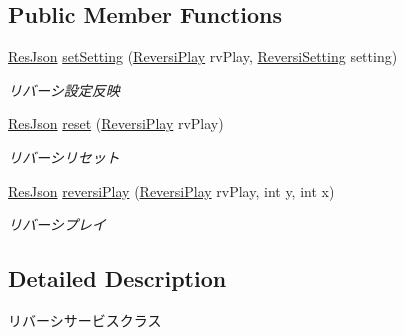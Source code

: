 \subsection*{Public Member Functions}
\begin{DoxyCompactItemize}
\item 
\hyperlink{classjp_1_1gr_1_1java__conf_1_1yuta__yoshinaga_1_1reversi_1_1model_1_1_res_json}{Res\+Json} \hyperlink{classjp_1_1gr_1_1java__conf_1_1yuta__yoshinaga_1_1reversi_1_1service_1_1_reversi_service_a58b49b782275a456cd4ae6ed332446e3}{set\+Setting} (\hyperlink{classjp_1_1gr_1_1java__conf_1_1yuta__yoshinaga_1_1reversi_1_1model_1_1_reversi_play}{Reversi\+Play} rv\+Play, \hyperlink{classjp_1_1gr_1_1java__conf_1_1yuta__yoshinaga_1_1reversi_1_1model_1_1_reversi_setting}{Reversi\+Setting} setting)
\begin{DoxyCompactList}\small\item\em リバーシ設定反映 \end{DoxyCompactList}\item 
\hyperlink{classjp_1_1gr_1_1java__conf_1_1yuta__yoshinaga_1_1reversi_1_1model_1_1_res_json}{Res\+Json} \hyperlink{classjp_1_1gr_1_1java__conf_1_1yuta__yoshinaga_1_1reversi_1_1service_1_1_reversi_service_ab2c1202edeb6a169bac4c65accc31165}{reset} (\hyperlink{classjp_1_1gr_1_1java__conf_1_1yuta__yoshinaga_1_1reversi_1_1model_1_1_reversi_play}{Reversi\+Play} rv\+Play)
\begin{DoxyCompactList}\small\item\em リバーシリセット \end{DoxyCompactList}\item 
\hyperlink{classjp_1_1gr_1_1java__conf_1_1yuta__yoshinaga_1_1reversi_1_1model_1_1_res_json}{Res\+Json} \hyperlink{classjp_1_1gr_1_1java__conf_1_1yuta__yoshinaga_1_1reversi_1_1service_1_1_reversi_service_a63e6f016d6aa03217b96782f0a8adc52}{reversi\+Play} (\hyperlink{classjp_1_1gr_1_1java__conf_1_1yuta__yoshinaga_1_1reversi_1_1model_1_1_reversi_play}{Reversi\+Play} rv\+Play, int y, int x)
\begin{DoxyCompactList}\small\item\em リバーシプレイ \end{DoxyCompactList}\end{DoxyCompactItemize}


\subsection{Detailed Description}
リバーシサービスクラス 

